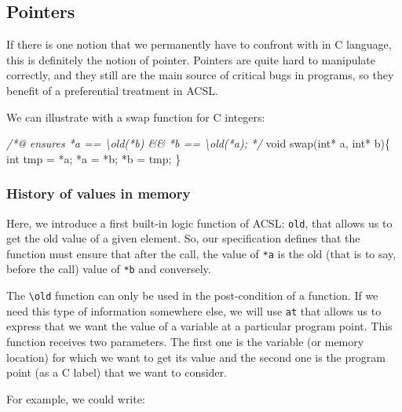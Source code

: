 \documentclass[12pt,francais,]{scrbook}
\newenvironment{Shaded}{}{}
\newcommand{\DataTypeTok}[1]{\textcolor[rgb]{0.56,0.13,0.00}{{#1}}}
\newcommand{\CommentTok}[1]{\textcolor[rgb]{0.38,0.63,0.69}{\textit{{#1}}}}
\newcommand{\NormalTok}[1]{{#1}}
\begin{document}
\subsection{Pointers}\label{pointers}

If there is one notion that we permanently have to confront with in C
language, this is definitely the notion of pointer. Pointers are quite
hard to manipulate correctly, and they still are the main source of
critical bugs in programs, so they benefit of a preferential treatment
in ACSL.

We can illustrate with a swap function for C integers:

\begin{footnotesize}\begin{Shaded}
\begin{Highlighting}[]
\CommentTok{/*@}
\CommentTok{  ensures *a == \textbackslash{}old(*b) && *b == \textbackslash{}old(*a);}
\CommentTok{*/}
\DataTypeTok{void} \NormalTok{swap(}\DataTypeTok{int}\NormalTok{* a, }\DataTypeTok{int}\NormalTok{* b)\{}
  \DataTypeTok{int} \NormalTok{tmp = *a;}
  \NormalTok{*a = *b;}
  \NormalTok{*b = tmp;}
\NormalTok{\}}
\end{Highlighting}
\end{Shaded}\end{footnotesize}

\subsubsection{History of values in
memory}\label{history-of-values-in-memory}

Here, we introduce a first built-in logic function of ACSL:
\texttt{old}, that allows us to get the old value of a given element.
So, our specification defines that the function must ensure that after
the call, the value of \texttt{*a} is the old (that is to say, before
the call) value of \texttt{*b} and conversely.

The \texttt{\textbackslash{}old} function can only be used in the
post-condition of a function. If we need this type of information
somewhere else, we will use \texttt{at} that allows us to express that
we want the value of a variable at a particular program point. This
function receives two parameters. The first one is the variable (or
memory location) for which we want to get its value and the second one
is the program point (as a C label) that we want to consider.

For example, we could write:
\end{document}
